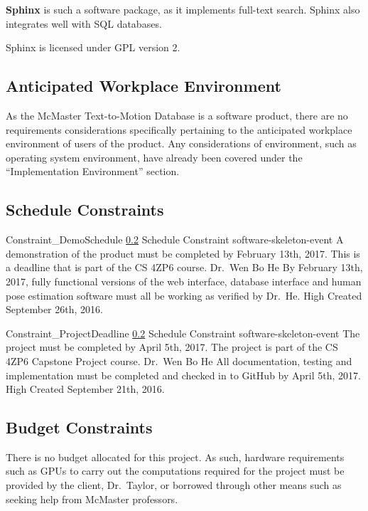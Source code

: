 \documentclass{scrreprt}
\begin{document}
\textbf{Sphinx} is such a software package, as it implements full-text search.
Sphinx also integrates well with SQL databases.

Sphinx is licensed under GPL version 2.

\subsection{Anticipated Workplace Environment}

As the McMaster Text-to-Motion Database is a software product, there are no
requirements considerations specifically pertaining to the anticipated
workplace environment of users of the product. Any considerations of
environment, such as operating system environment, have already been covered
under the ``Implementation Environment'' section.

\subsection{Schedule Constraints}
\label{req-schedule-constraint}

\requirement
{Constraint_DemoSchedule}
{\ref{req-schedule-constraint} Schedule Constraint }
{software-skeleton-event}
{A demonstration of the product must be completed by February 13th, 2017.}
{This is a deadline that is part of the CS 4ZP6 course.}
{Dr.\ Wen Bo He}
{By February 13th, 2017, fully functional versions of the web interface,
 database interface and human pose estimation software must all be working as
 verified by Dr.\ He.}
{High}
{Created September 26th, 2016.}

\requirement
{Constraint_ProjectDeadline}
{\ref{req-schedule-constraint} Schedule Constraint}
{software-skeleton-event}
{The project must be completed by April 5th, 2017.}
{The project is part of the CS 4ZP6 Capstone Project course.}
{Dr.\ Wen Bo He}
{All documentation, testing and implementation must be completed and checked in
 to GitHub by April 5th, 2017.}
{High}
{Created September 21th, 2016.}

\subsection{Budget Constraints}

There is no budget allocated for this project. As such, hardware requirements
such as GPUs to carry out the computations required for the project must be
provided by the client, Dr.\ Taylor, or borrowed through other means such as
seeking help from McMaster professors.
\end{document}
